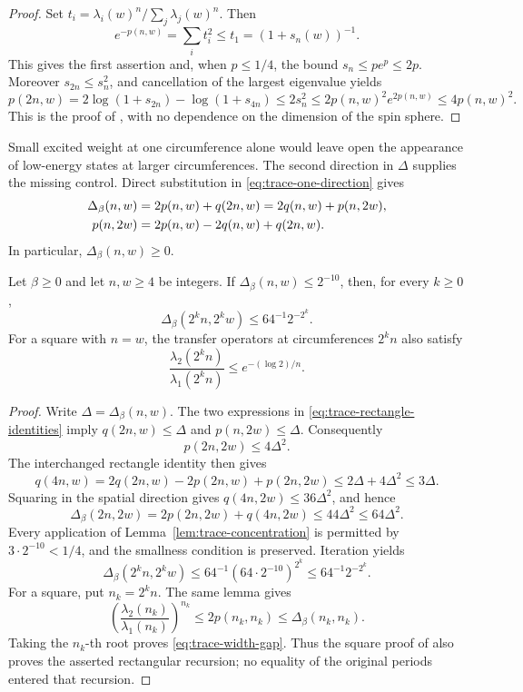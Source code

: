 \begin{proof}
Set $t_i=\lambda_i(w)^n/\sum_j\lambda_j(w)^n$.  Then
\[
 e^{-p(n,w)}=\sum_i t_i^2\le t_1=(1+s_n(w))^{-1}.
\]
This gives the first assertion and, when $p\le1/4$, the bound
$s_n\le pe^p\le2p$.  Moreover $s_{2n}\le s_n^2$, and cancellation
of the largest eigenvalue yields
\[
 p(2n,w)=2\log(1+s_{2n})-\log(1+s_{4n})
     \le2s_n^2\le2p(n,w)^2e^{2p(n,w)}
     \le4p(n,w)^2.
\]
This is the proof of , with no dependence on the
dimension of the spin sphere.
\end{proof}

Small excited weight at one circumference alone would leave open the
appearance of low-energy states at larger circumferences.  The second
direction in $\Delta$ supplies the missing control.  Direct substitution
in \eqref{eq:trace-one-direction} gives
\begin{align}
 \Delta_\beta(n,w)
   &=2p(n,w)+q(2n,w)
     =2q(n,w)+p(n,2w),\notag\\
 p(n,2w)&=2p(n,w)-2q(n,w)+q(2n,w).
 \label{eq:trace-rectangle-identities}
\end{align}
In particular, $\Delta_\beta(n,w)\ge0$.

\begin{proposition}
\label{prop:trace-doubling}
Let $\beta\ge0$ and let $n,w\ge4$ be integers.  If
$\Delta_\beta(n,w)\le2^{-10}$, then, for every $k\ge0$,
\begin{equation}
 \Delta_\beta(2^kn,2^kw)\le64^{-1}2^{-2^k}.
 \label{eq:orig-25}
\end{equation}
For a square with $n=w$, the transfer operators at circumferences
$2^kn$ also satisfy
\begin{equation}
 \frac{\lambda_2(2^kn)}{\lambda_1(2^kn)}
       \le e^{-(\log2)/n}.
 \label{eq:trace-width-gap}
\end{equation}
\end{proposition}

\begin{proof}
Write $\Delta=\Delta_\beta(n,w)$.  The two expressions in
\eqref{eq:trace-rectangle-identities} imply
$q(2n,w)\le\Delta$ and $p(n,2w)\le\Delta$.  Consequently
\[
 p(2n,2w)\le4\Delta^2.
\]
The interchanged rectangle identity then gives
\[
 q(4n,w)=2q(2n,w)-2p(2n,w)+p(2n,2w)
       \le2\Delta+4\Delta^2\le3\Delta.
\]
Squaring in the spatial direction gives
$q(4n,2w)\le36\Delta^2$, and hence
\[
 \Delta_\beta(2n,2w)
   =2p(2n,2w)+q(4n,2w)
   \le44\Delta^2\le64\Delta^2.
\]
Every application of Lemma~\ref{lem:trace-concentration} is permitted
by $3\cdot2^{-10}<1/4$, and the smallness condition is preserved.
Iteration yields
\[
 \Delta_\beta(2^kn,2^kw)
       \le64^{-1}(64\cdot2^{-10})^{2^k}
       \le64^{-1}2^{-2^k}.
\]
For a square, put $n_k=2^kn$.  The same lemma gives
\[
 \left(\frac{\lambda_2(n_k)}{\lambda_1(n_k)}\right)^{n_k}
       \le2p(n_k,n_k)\le\Delta_\beta(n_k,n_k).
\]
Taking the $n_k$-th root proves
\eqref{eq:trace-width-gap}.  Thus the square proof of
 also proves the asserted rectangular recursion;
no equality of the original periods entered that recursion.
\end{proof}

